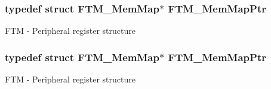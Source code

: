 \subsubsection[{\texorpdfstring{F\+T\+M\+\_\+\+Mem\+Map\+Ptr}{FTM_MemMapPtr}}]{\setlength{\rightskip}{0pt plus 5cm}typedef struct {\bf F\+T\+M\+\_\+\+Mem\+Map}$\ast$ {\bf F\+T\+M\+\_\+\+Mem\+Map\+Ptr}}\hypertarget{group___f_t_m___peripheral_gaafa7875c9deb2b3afe4aa22ce6a99d39}{}\label{group___f_t_m___peripheral_gaafa7875c9deb2b3afe4aa22ce6a99d39}
F\+TM -\/ Peripheral register structure 
\subsubsection[{\texorpdfstring{F\+T\+M\+\_\+\+Mem\+Map\+Ptr}{FTM_MemMapPtr}}]{\setlength{\rightskip}{0pt plus 5cm}typedef struct {\bf F\+T\+M\+\_\+\+Mem\+Map}$\ast$ {\bf F\+T\+M\+\_\+\+Mem\+Map\+Ptr}}\hypertarget{group___f_t_m___peripheral_gaafa7875c9deb2b3afe4aa22ce6a99d39}{}\label{group___f_t_m___peripheral_gaafa7875c9deb2b3afe4aa22ce6a99d39}
F\+TM -\/ Peripheral register structure 